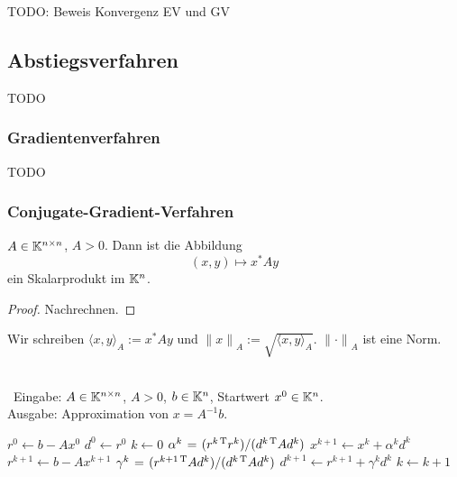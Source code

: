 TODO: Beweis Konvergenz EV und GV

\subsection{Abstiegsverfahren}

TODO

\subsubsection{Gradientenverfahren}

TODO

\subsubsection{Conjugate-Gradient-Verfahren}
\begin{Lemma}
$A \in \mathbb K^{n\times n}$, $A > 0$. Dann ist die Abbildung $$(x,y) \mapsto x^* A y$$
ein Skalarprodukt im $\mathbb K^n$.
\end{Lemma}
\begin{proof}
Nachrechnen.
\end{proof}
Wir schreiben $\langle x, y \rangle_A := x^*Ay$ und
${\|x\|}_A := \sqrt{\langle x, y \rangle_A}$.
${\|\cdot\|}_A$ ist eine Norm.

\begin{Algorithmus}[CG-Verfahren] \quad\\\
Eingabe: $A \in \mathbb K^{n\times n}$, $A > 0$, $b \in \mathbb K^n$, 
  Startwert $x^0 \in \mathbb K^n$.\\
Ausgabe: Approximation von $x = A^{-1}b$.
\begin{codebox}
\li $r^0 \gets b - Ax^0$
\li $d^0 \gets r^0$
\li $k \gets 0$
\li \Repeat
    \li $\alpha^k \mathrel{\hspace{1pt}=\hspace{1pt}} (r^{k\,\mathrm T} r^k) / (d^{k\,\mathrm T} A d^k)$
    \li $x^{k+1} \gets x^k + \alpha^k d^k$
    \li $r^{k+1} \gets b - A x^{k+1}$
    \li $\gamma^k \mathrel{\hspace{1pt}=\hspace{1pt}} (r^{k+1\,\mathrm T} A d^k) / (d^{k\,\mathrm T} A d^k)$
    \li $d^{k+1} \gets r^{k+1} + \gamma^k d^k$
    \li $k \gets k + 1$
  \End
\end{codebox}
\end{Algorithmus}
